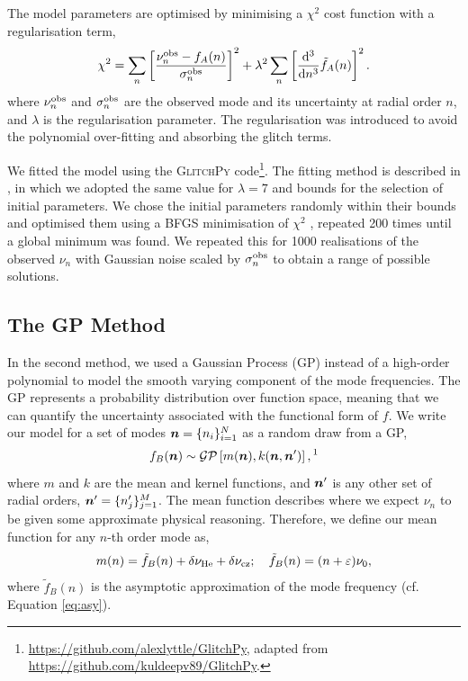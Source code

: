 The model parameters are optimised by minimising a \(\chi^2\) cost function with a regularisation term,
%
\begin{equation}
    \chi^2 = \sum_n \left[ \frac{\nu_n^{{\mathrm{obs}}} - f_{A}(n)}{\sigma_n^{{\mathrm{obs}}}} \right]^2 + \lambda^2 \sum_n \left[ \frac{\mathrm{d}^3}{\mathrm{d} n^3} \tilde{f}_A(n)\right]^2.
\end{equation}
%
where \(\nu_n^{{\mathrm{obs}}}\) and \(\sigma_n^{{\mathrm{obs}}}\) are the observed mode and its uncertainty at radial order \(n\), and \(\lambda\) is the regularisation parameter. The regularisation was introduced to avoid the polynomial over-fitting and absorbing the glitch terms.

We fitted the model using the \textsc{GlitchPy} code\footnote{\url{https://github.com/alexlyttle/GlitchPy}, adapted from \url{https://github.com/kuldeepv89/GlitchPy}.}. The fitting method is described in \citet{Verma.Raodeo.ea2019}, in which we adopted the same value for \(\lambda=7\) and bounds for the selection of initial parameters. We chose the initial parameters randomly within their bounds and optimised them using a BFGS minimisation of \(\chi^2\) \citep{Fletcher1987}, repeated 200 times until a global minimum was found. We repeated this for 1000 realisations of the observed \(\nu_n\) with Gaussian noise scaled by \(\sigma_n^{{\mathrm{obs}}}\) to obtain a range of possible solutions.

\subsection{The GP Method}

In the second method, we used a Gaussian Process (GP) instead of a high-order polynomial to model the smooth varying component of the mode frequencies. The GP represents a probability distribution over function space, meaning that we can quantify the uncertainty associated with the functional form of $f$. We write our model for a set of modes \(\bm{n} = \{n_i\}_{i=1}^N\) as a random draw from a GP,
%
\begin{equation}
    f_{B}(\vect{n}) \sim \mathcal{GP}\left[ m(\vect{n}), k(\vect{n}, \vect{n}') \right],\text{\footnotemark}
\end{equation}
%
%
where \(m\) and \(k\) are the mean and kernel functions, and \(\bm{n}'\) is any other set of radial orders, \(\bm{n}' = \{n'_j\}_{j=1}^M\). The mean function describes where we expect \(\nu_n\) to be given some approximate physical reasoning. Therefore, we define our mean function for any \(n\)-th order mode as,
%
\begin{equation}
    m(n) = \tilde{f}_B(n) + \delta\nu_{{\mathrm{He}}} + \delta\nu_{{\mathrm{cz}}}; \quad \tilde{f}_B(n) = (n + \varepsilon) \nu_0, \label{eq:asy-glitch}
\end{equation}
%
where \(\tilde{f}_B(n)\) is the asymptotic approximation of the mode frequency (cf. Equation \ref{eq:asy}).

